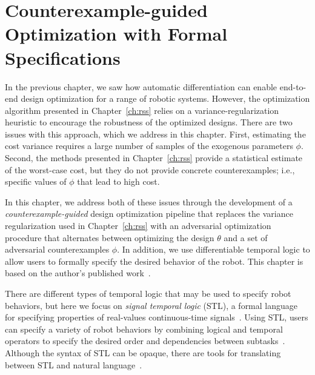\newcommand{\ieeecopyright}{\copyright 2022 IEEE}

\chapter{Counterexample-guided Optimization with Formal Specifications}\label{ch:iros}

In the previous chapter, we saw how automatic differentiation can enable end-to-end design optimization for a range of robotic systems. However, the optimization algorithm presented in Chapter~\ref{ch:rss} relies on a variance-regularization heuristic to encourage the robustness of the optimized designs. There are two issues with this approach, which we address in this chapter. First, estimating the cost variance requires a large number of samples of the exogenous parameters $\phi$. Second, the methods presented in Chapter~\ref{ch:rss} provide a statistical estimate of the worst-case cost, but they do not provide concrete counterexamples; i.e., specific values of $\phi$ that lead to high cost.

In this chapter, we address both of these issues through the development of a \textit{counterexample-guided} design optimization pipeline that replaces the variance regularization used in Chapter~\ref{ch:rss} with an adversarial optimization procedure that alternates between optimizing the design $\theta$ and a set of adversarial counterexamples $\phi$. In addition, we use differentiable temporal logic to allow users to formally specify the desired behavior of the robot. This chapter is based on the author's published work~\cite{dawsonRobustCounterexampleguidedOptimization2022b}.

There are different types of temporal logic that may be used to specify robot behaviors, but here we focus on \textit{signal temporal logic} (STL), a formal language for specifying properties of real-values continuous-time signals~\cite{donzeBreachToolboxVerification2010,sunMultiagentMotionPlanning2022,pantSmoothOperatorControl2017}. Using STL, users can specify a variety of robot behaviors by combining logical and temporal operators to specify the desired order and dependencies between subtasks~\cite{plakuMotionPlanningTemporallogic2016,sunMultiagentMotionPlanning2022,takanoContinuousOptimizationBasedTask2021}. Although the syntax of STL can be opaque, there are tools for translating between STL and natural language~\cite{chenNL2TLTransformingNatural2023}.

